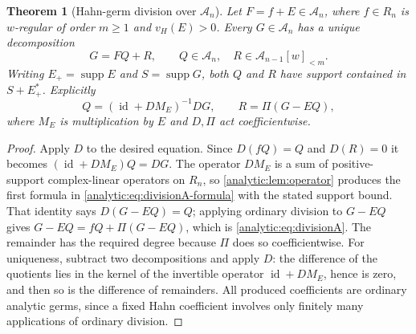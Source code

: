 \documentclass[11pt,letterpaper]{article}
\newtheorem{theorem}{Theorem}[section]
\theoremstyle{definition}
\theoremstyle{remark}
\newcommand{\A}{\mathscr A}
\newcommand{\supp}{\operatorname{supp}}
\newcommand{\id}{\operatorname{id}}
\newcommand{\vH}{v_{\!H}}
\numberwithin{equation}{section}
\begin{document}
\begin{theorem}[Hahn-germ division over $\A_n$]
\label{analytic:thm:divisionA}
Let $F=f+E\in\A_n$, where $f\in R_n$ is $w$-regular of order $m\ge1$ and
$\vH(E)>0$. Every $G\in\A_n$ has a unique decomposition
\begin{equation}\label{analytic:eq:divisionA}
 G=FQ+R,\qquad Q\in\A_n,\quad R\in\A_{n-1}[w]_{<m}.
\end{equation}
Writing $E_+=\supp E$ and $S=\supp G$, both $Q$ and $R$ have support
contained in $S+E_+^*$. Explicitly
\begin{equation}\label{analytic:eq:divisionA-formula}
 Q=(\id+DM_E)^{-1}DG,\qquad R=\Pi(G-EQ),
\end{equation}
where $M_E$ is multiplication by $E$ and $D,\Pi$ act coefficientwise.
\end{theorem}
\begin{proof}
Apply $D$ to the desired equation. Since $D(fQ)=Q$ and $D(R)=0$ it becomes
$(\id+DM_E)Q=DG$. The operator $DM_E$ is a sum of positive-support
complex-linear operators on $R_n$, so \cref{analytic:lem:operator} produces
the first formula in \eqref{analytic:eq:divisionA-formula} with the stated
support bound. That identity says $D(G-EQ)=Q$; applying ordinary division to
$G-EQ$ gives $G-EQ=fQ+\Pi(G-EQ)$, which is \eqref{analytic:eq:divisionA}.
The remainder has the required degree because $\Pi$ does so coefficientwise.
For uniqueness, subtract two decompositions and apply $D$: the difference of
the quotients lies in the kernel of the invertible operator $\id+DM_E$,
hence is zero, and then so is the difference of remainders. All produced
coefficients are ordinary analytic germs, since a fixed Hahn coefficient
involves only finitely many applications of ordinary division.
\end{proof}
\end{document}
